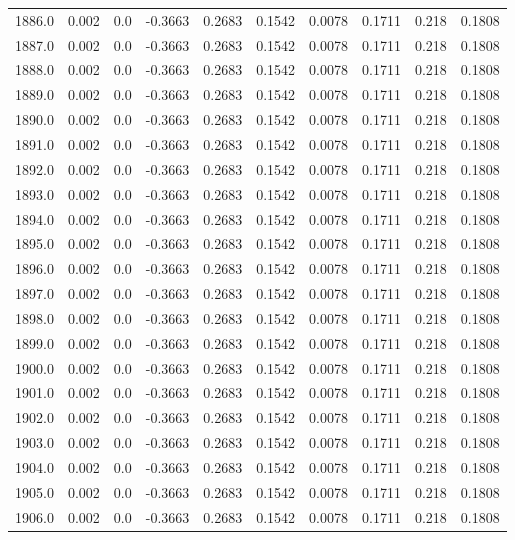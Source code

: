 \begin{longtable}{lrrrrrrrrr}
1886.0 & 0.002 & 0.0 & -0.3663 & 0.2683 & 0.1542 & 0.0078 & 0.1711 & 0.218 & 0.1808 \\
1887.0 & 0.002 & 0.0 & -0.3663 & 0.2683 & 0.1542 & 0.0078 & 0.1711 & 0.218 & 0.1808 \\
1888.0 & 0.002 & 0.0 & -0.3663 & 0.2683 & 0.1542 & 0.0078 & 0.1711 & 0.218 & 0.1808 \\
1889.0 & 0.002 & 0.0 & -0.3663 & 0.2683 & 0.1542 & 0.0078 & 0.1711 & 0.218 & 0.1808 \\
1890.0 & 0.002 & 0.0 & -0.3663 & 0.2683 & 0.1542 & 0.0078 & 0.1711 & 0.218 & 0.1808 \\
1891.0 & 0.002 & 0.0 & -0.3663 & 0.2683 & 0.1542 & 0.0078 & 0.1711 & 0.218 & 0.1808 \\
1892.0 & 0.002 & 0.0 & -0.3663 & 0.2683 & 0.1542 & 0.0078 & 0.1711 & 0.218 & 0.1808 \\
1893.0 & 0.002 & 0.0 & -0.3663 & 0.2683 & 0.1542 & 0.0078 & 0.1711 & 0.218 & 0.1808 \\
1894.0 & 0.002 & 0.0 & -0.3663 & 0.2683 & 0.1542 & 0.0078 & 0.1711 & 0.218 & 0.1808 \\
1895.0 & 0.002 & 0.0 & -0.3663 & 0.2683 & 0.1542 & 0.0078 & 0.1711 & 0.218 & 0.1808 \\
1896.0 & 0.002 & 0.0 & -0.3663 & 0.2683 & 0.1542 & 0.0078 & 0.1711 & 0.218 & 0.1808 \\
1897.0 & 0.002 & 0.0 & -0.3663 & 0.2683 & 0.1542 & 0.0078 & 0.1711 & 0.218 & 0.1808 \\
1898.0 & 0.002 & 0.0 & -0.3663 & 0.2683 & 0.1542 & 0.0078 & 0.1711 & 0.218 & 0.1808 \\
1899.0 & 0.002 & 0.0 & -0.3663 & 0.2683 & 0.1542 & 0.0078 & 0.1711 & 0.218 & 0.1808 \\
1900.0 & 0.002 & 0.0 & -0.3663 & 0.2683 & 0.1542 & 0.0078 & 0.1711 & 0.218 & 0.1808 \\
1901.0 & 0.002 & 0.0 & -0.3663 & 0.2683 & 0.1542 & 0.0078 & 0.1711 & 0.218 & 0.1808 \\
1902.0 & 0.002 & 0.0 & -0.3663 & 0.2683 & 0.1542 & 0.0078 & 0.1711 & 0.218 & 0.1808 \\
1903.0 & 0.002 & 0.0 & -0.3663 & 0.2683 & 0.1542 & 0.0078 & 0.1711 & 0.218 & 0.1808 \\
1904.0 & 0.002 & 0.0 & -0.3663 & 0.2683 & 0.1542 & 0.0078 & 0.1711 & 0.218 & 0.1808 \\
1905.0 & 0.002 & 0.0 & -0.3663 & 0.2683 & 0.1542 & 0.0078 & 0.1711 & 0.218 & 0.1808 \\
1906.0 & 0.002 & 0.0 & -0.3663 & 0.2683 & 0.1542 & 0.0078 & 0.1711 & 0.218 & 0.1808 \\

\end{longtable}
